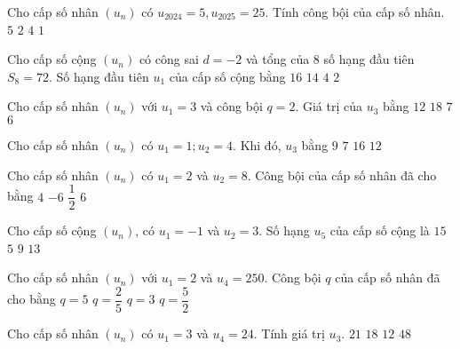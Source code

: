 \begin{ex}
Cho cấp số nhân $(u_n)$ có $u_{2024}=5,u_{2025}=25$. Tính công bội của cấp số nhân.
\choice
{\True $5$}
{$2$}
{$4$}
{$1$}
\end{ex}
\begin{ex}
Cho cấp số cộng $(u_n)$ có công sai $d=-2$ và tổng của $8$ số hạng đầu tiên $S_8=72$. Số hạng đầu tiên $u_1$ của cấp số cộng bằng
\choice
{\True $16$}
{$14$}
{$4$}
{$2$}
\end{ex}
\begin{ex}
Cho cấp số nhân $(u_n)$ với $u_1=3$ và công bội $q=2$. Giá trị của $u_3$ bằng 
\choice
{\True $12$}
{$18$}
{$7$}
{$6$}
\end{ex}
\begin{ex}
Cho cấp số nhân $(u_n)$ có $u_1=1;u_2=4$. Khi đó, $u_3$ bằng
\choice
{$9$}
{$7$}
{\True $16$}
{$12$}
\end{ex}
\begin{ex}
Cho cấp số nhân $(u_n)$ có $u_1=2$ và $u_2=8$. Công bội của cấp số nhân đã cho bằng
\choice
{\True $4$}
{$-6$}
{$\dfrac{1}{2}$}
{$6$}
\end{ex}
\begin{ex}
Cho cấp số cộng $(u_n)$, có $u_1=-1$ và $u_2=3$. Số hạng $u_5$ của cấp số cộng là
\choice
{\True $15$}
{$5$}
{$9$}
{$13$}
\end{ex}
\begin{ex}
Cho cấp số nhân $(u_n)$ với $u_1=2$ và $u_4=250$. Công bội $q$ của cấp số nhân đã cho bằng
\choice
{\True $q=5$}
{$q=\dfrac{2}{5}$}
{$q=3$}
{$q=\dfrac{5}{2}$ }
\end{ex}
\begin{ex}
Cho cấp số nhân $(u_n)$ có $u_1=3$ và $u_4=24$. Tính giá trị $u_3$.
\choice
{$21$}
{$18$}
{\True $12$}
{$48$}
\end{ex}
